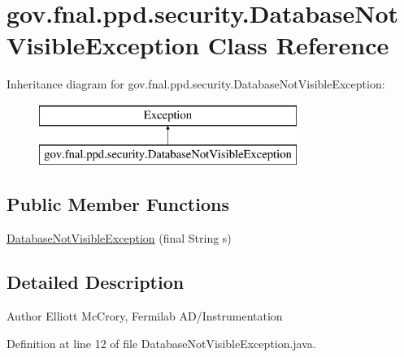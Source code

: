 \hypertarget{classgov_1_1fnal_1_1ppd_1_1security_1_1DatabaseNotVisibleException}{\section{gov.\-fnal.\-ppd.\-security.\-Database\-Not\-Visible\-Exception Class Reference}
\label{classgov_1_1fnal_1_1ppd_1_1security_1_1DatabaseNotVisibleException}
}
Inheritance diagram for gov.\-fnal.\-ppd.\-security.\-Database\-Not\-Visible\-Exception\-:\begin{figure}[H]
\begin{center}
\leavevmode
\includegraphics[height=2.000000cm]{classgov_1_1fnal_1_1ppd_1_1security_1_1DatabaseNotVisibleException}
\end{center}
\end{figure}
\subsection*{Public Member Functions}
\begin{DoxyCompactItemize}
\item 
\hyperlink{classgov_1_1fnal_1_1ppd_1_1security_1_1DatabaseNotVisibleException_a32f650c9cc95fb8fe0951d92a68c8069}{Database\-Not\-Visible\-Exception} (final String s)
\end{DoxyCompactItemize}


\subsection{Detailed Description}
\begin{DoxyAuthor}{Author}
Elliott Mc\-Crory, Fermilab A\-D/\-Instrumentation 
\end{DoxyAuthor}


Definition at line 12 of file Database\-Not\-Visible\-Exception.\-java.



